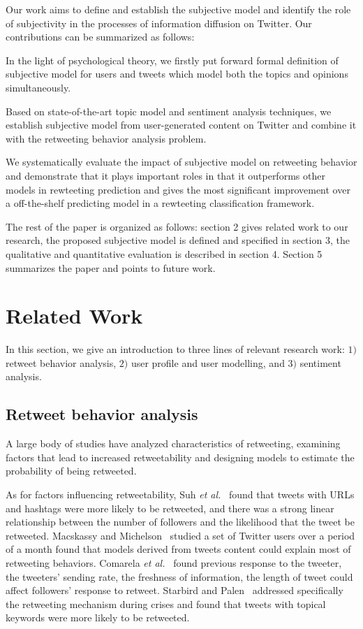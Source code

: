 \documentclass{acm_proc_article-sp}
\begin{document}
Our work aims to define and establish the subjective model and identify the role of subjectivity in the processes of information diffusion on Twitter. Our contributions can be summarized as follows:
\begin{itemize*}
\item In the light of psychological theory, we firstly put forward formal definition of subjective model for users and tweets which model both the topics and opinions simultaneously.
\item Based on state-of-the-art topic model and sentiment analysis techniques, we establish subjective model from user-generated content on Twitter and combine it with the retweeting behavior analysis problem.
\item We systematically evaluate the impact of subjective model on retweeting behavior and demonstrate that it plays important roles in that it outperforms other models in rewteeting prediction and gives the most significant improvement over a off-the-shelf predicting model in a rewteeting classification framework. 
\end{itemize*}
The rest of the paper is organized as follows: section 2 gives related work to our research, the proposed subjective model is defined and specified in section 3, the qualitative and quantitative evaluation is described in section 4. Section 5 summarizes the paper and points to future work.

\section{Related Work}
\label{relatedwork}
In this section, we give an introduction to three lines of relevant research work: $ 1) $ retweet behavior analysis, $ 2) $ user profile and user modelling, and $  3)$ sentiment analysis. 
\subsection{Retweet behavior analysis}
A large body of studies have analyzed characteristics of retweeting, examining factors that lead to increased retweetability and designing models to estimate the probability of being retweeted. 

As for factors influencing retweetability, Suh \emph{et al.}~\cite{Suh2010} found that tweets with URLs and hashtags were more likely to be retweeted, and there was a strong linear relationship between the number of followers and the likelihood that the tweet be retweeted. 
Macskassy and Michelson~\cite{conf/icwsm/MacskassyM11} studied a set of Twitter users over a period of a month found that models derived from tweets content could explain most of retweeting behaviors.
Comarela \emph{et al.}~\cite{Comarela:2012UFA} found previous response to the tweeter, the tweeters’ sending rate, the freshness of information, the length of tweet could affect followers’ response to retweet. 
Starbird and Palen~\cite{Starbird:2012RRI} addressed specifically the retweeting mechanism during crises and found that tweets with topical keywords were more likely to be retweeted. 
\end{document}
